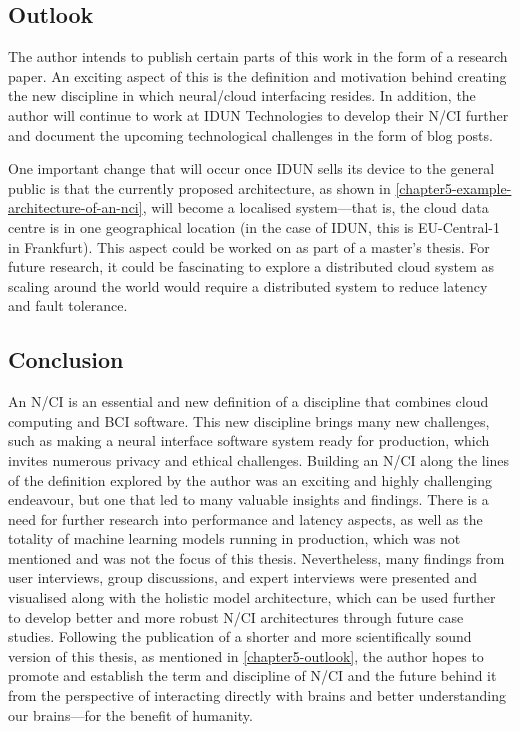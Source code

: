 \subsection{Outlook}
\label{chapter5-outlook}

The author intends to publish certain parts of this work in the form of a research paper. An exciting aspect of this is the definition and motivation behind creating the new discipline in which neural/cloud interfacing resides. In addition, the author will continue to work at IDUN Technologies to develop their N/CI further and document the upcoming technological challenges in the form of blog posts.

One important change that will occur once IDUN sells its device to the general public is that the currently proposed architecture, as shown in \autoref{chapter5-example-architecture-of-an-nci}, will become a localised system—that is, the cloud data centre is in one geographical location (in the case of IDUN, this is EU-Central-1 in Frankfurt). This aspect could be worked on as part of a master’s thesis. For future research, it could be fascinating to explore a distributed cloud system as scaling around the world would require a distributed system to reduce latency and fault tolerance.

\subsection{Conclusion}
\label{chapter5-conclusion}

An N/CI is an essential and new definition of a discipline that combines cloud computing and BCI software. This new discipline brings many new challenges, such as making a neural interface software system ready for production, which invites numerous privacy and ethical challenges. Building an N/CI along the lines of the definition explored by the author was an exciting and highly challenging endeavour, but one that led to many valuable insights and findings. There is a need for further research into performance and latency aspects, as well as the totality of machine learning models running in production, which was not mentioned and was not the focus of this thesis. Nevertheless, many findings from user interviews, group discussions, and expert interviews were presented and visualised along with the holistic model architecture, which can be used further to develop better and more robust N/CI architectures through future case studies. Following the publication of a shorter and more scientifically sound version of this thesis, as mentioned in \autoref{chapter5-outlook}, the author hopes to promote and establish the term and discipline of N/CI and the future behind it from the perspective of interacting directly with brains and better understanding our brains—for the benefit of humanity.

